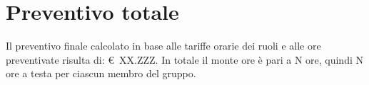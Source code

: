 \section{Preventivo totale}

Il preventivo finale calcolato in base alle tariffe orarie dei ruoli e alle ore preventivate risulta di: \euro~XX.ZZZ.
In totale il monte ore \`e pari a N ore, quindi N ore a testa per ciascun membro del gruppo.
